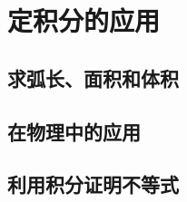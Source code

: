 \section{定积分的应用}
\subsection{求弧长、面积和体积}
\clearpage
\subsection{在物理中的应用}
\clearpage
\subsection{利用积分证明不等式}

\clearpage

